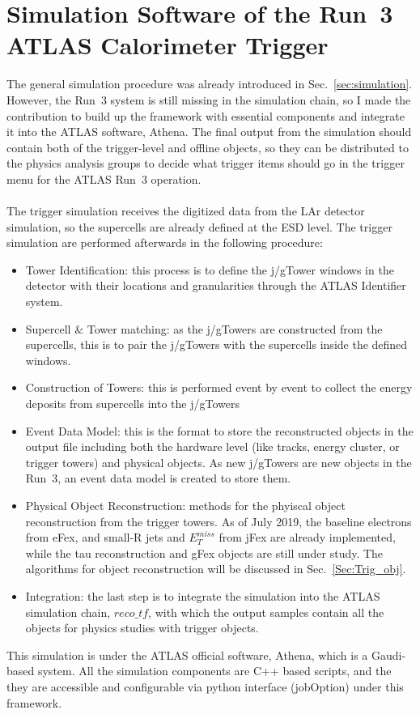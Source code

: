 \section{Simulation Software of the Run~3 ATLAS Calorimeter Trigger}
The general simulation procedure was already introduced in Sec.~\ref{sec:simulation}. However, the Run~3 system is still missing in the simulation chain, so I made the contribution to build up the framework with essential components and integrate it into the ATLAS software, Athena. The final output from the simulation should contain both of the trigger-level and offline objects, so they can be distributed to the physics analysis groups to decide what trigger items should go in the trigger menu for the ATLAS Run~3 operation. 
\\
\\The trigger simulation receives the digitized data from the LAr detector simulation, so the supercells are already defined at the ESD level. The trigger simulation are performed afterwards in the following procedure:
\begin{itemize}
	\item Tower Identification: this process is to define the j/gTower windows in the detector with their locations and granularities through the ATLAS Identifier system.
	\item Supercell $\&$ Tower matching: as the j/gTowers are constructed from the supercells, this is to pair the j/gTowers with the supercells inside the defined windows.
	\item Construction of Towers: this is performed event by event to collect the energy deposits from supercells into the j/gTowers
	\item Event Data Model: this is the format to store the reconstructed objects in the output file including both the hardware level (like tracks, energy cluster, or trigger towers) and physical objects. As new j/gTowers are new objects in the Run~3, an event data model is created to store them.
	\item Physical Object Reconstruction: methods for the phyiscal object reconstruction from the trigger towers. As of July 2019, the baseline electrons from eFex, and small-R jets and $E^{miss}_{T}$ from jFex are already implemented, while the tau reconstruction and gFex objects are still under study. The algorithms for object reconstruction will be discussed in Sec.~\ref{Sec:Trig_obj}. 
	\item Integration: the last step is to integrate the simulation into the ATLAS simulation chain, $reco\_tf$\cite{Stewart:2014ida}, with which the output samples contain all the objects for physics studies with trigger objects. 
\end{itemize}
\noindent
This simulation is under the ATLAS official software, Athena, which is a Gaudi-based system\cite{Mato:2010zz}. All the simulation components are C++ based scripts, and the they are accessible and configurable via python interface (jobOption) under this framework.
